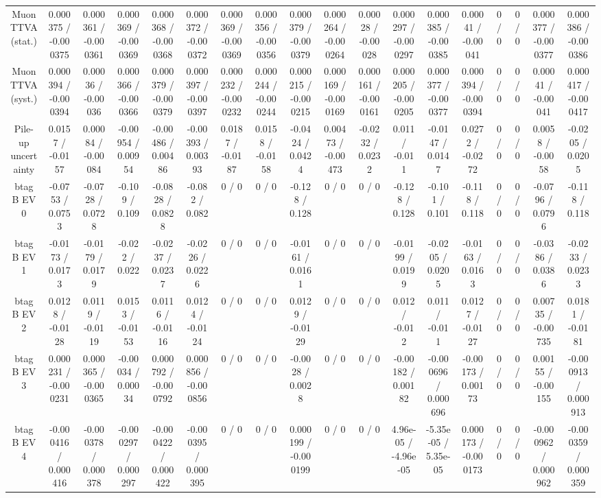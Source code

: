 \documentclass[10pt]{article}
\begin{document}
\begin{table}[htbp]
\begin{center}
\begin{tabular}{|c|c|c|c|c|c|c|c|c|c|c|c|c|c|c|c|c|c|}
  Muon TTVA (stat.) & 0.000375 / -0.000375 & 0.000361 / -0.000361 & 0.000369 / -0.000369 & 0.000368 / -0.000368 & 0.000372 / -0.000372 & 0.000369 / -0.000369 & 0.000356 / -0.000356 & 0.000379 / -0.000379 & 0.000264 / -0.000264 & 0.00028 / -0.00028 & 0.000297 / -0.000297 & 0.000385 / -0.000385 & 0.00041 / -0.00041 & 0 / 0 & 0 / 0 & 0.000377 / -0.000377 & 0.000386 / -0.000386 \\ 
  Muon TTVA (syst.) & 0.000394 / -0.000394 & 0.00036 / -0.00036 & 0.000366 / -0.000366 & 0.000379 / -0.000379 & 0.000397 / -0.000397 & 0.000232 / -0.000232 & 0.000244 / -0.000244 & 0.000215 / -0.000215 & 0.000169 / -0.000169 & 0.000161 / -0.000161 & 0.000205 / -0.000205 & 0.000377 / -0.000377 & 0.000394 / -0.000394 & 0 / 0 & 0 / 0 & 0.00041 / -0.00041 & 0.000417 / -0.000417 \\ 
  Pile-up uncertainty & 0.0157 / -0.0157 & 0.00084 / -0.00084 & -0.00954 / 0.00954 & -0.00486 / 0.00486 & -0.00393 / 0.00393 & 0.0187 / -0.0187 & 0.0158 / -0.0158 & -0.0424 / 0.0424 & 0.00473 / -0.00473 & -0.0232 / 0.0232 & 0.011 / -0.011 & -0.0147 / 0.0147 & 0.0272 / -0.0272 & 0 / 0 & 0 / 0 & 0.0058 / -0.0058 & -0.0205 / 0.0205 \\ 
  btag B EV 0 & -0.0753 / 0.0753 & -0.0728 / 0.0728 & -0.109 / 0.109 & -0.0828 / 0.0828 & -0.082 / 0.082 & 0 / 0 & 0 / 0 & -0.128 / 0.128 & 0 / 0 & 0 / 0 & -0.128 / 0.128 & -0.101 / 0.101 & -0.118 / 0.118 & 0 / 0 & 0 / 0 & -0.0796 / 0.0796 & -0.118 / 0.118 \\ 
  btag B EV 1 & -0.0173 / 0.0173 & -0.0179 / 0.0179 & -0.022 / 0.022 & -0.0237 / 0.0237 & -0.0226 / 0.0226 & 0 / 0 & 0 / 0 & -0.0161 / 0.0161 & 0 / 0 & 0 / 0 & -0.0199 / 0.0199 & -0.0205 / 0.0205 & -0.0163 / 0.0163 & 0 / 0 & 0 / 0 & -0.0386 / 0.0386 & -0.0233 / 0.0233 \\ 
  btag B EV 2 & 0.0128 / -0.0128 & 0.0119 / -0.0119 & 0.0153 / -0.0153 & 0.0116 / -0.0116 & 0.0124 / -0.0124 & 0 / 0 & 0 / 0 & 0.0129 / -0.0129 & 0 / 0 & 0 / 0 & 0.012 / -0.012 & 0.011 / -0.011 & 0.0127 / -0.0127 & 0 / 0 & 0 / 0 & 0.00735 / -0.00735 & 0.0181 / -0.0181 \\ 
  btag B EV 3 & 0.000231 / -0.000231 & 0.000365 / -0.000365 & -0.00034 / 0.00034 & 0.000792 / -0.000792 & 0.000856 / -0.000856 & 0 / 0 & 0 / 0 & -0.0028 / 0.0028 & 0 / 0 & 0 / 0 & -0.00182 / 0.00182 & -0.000696 / 0.000696 & -0.00173 / 0.00173 & 0 / 0 & 0 / 0 & 0.00155 / -0.00155 & -0.000913 / 0.000913 \\ 
  btag B EV 4 & -0.000416 / 0.000416 & -0.000378 / 0.000378 & -0.000297 / 0.000297 & -0.000422 / 0.000422 & -0.000395 / 0.000395 & 0 / 0 & 0 / 0 & 0.000199 / -0.000199 & 0 / 0 & 0 / 0 & 4.96e-05 / -4.96e-05 & -5.35e-05 / 5.35e-05 & 0.000173 / -0.000173 & 0 / 0 & 0 / 0 & -0.000962 / 0.000962 & -0.000359 / 0.000359 \\ 

\end{tabular}
\end{center}
\end{table}
\end{document}
